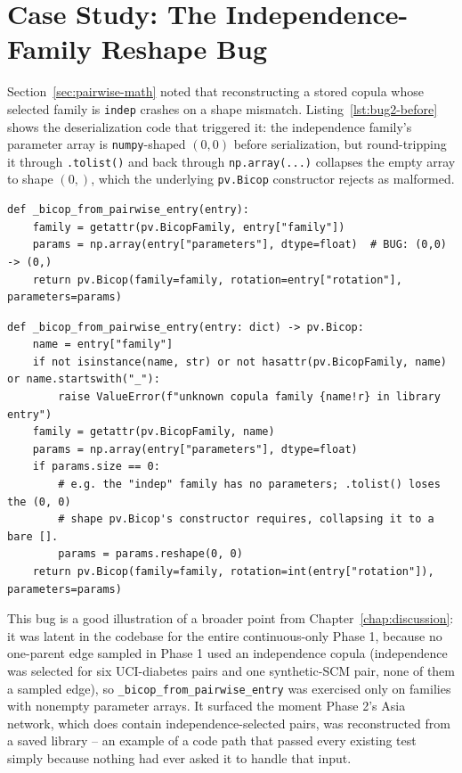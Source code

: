 \documentclass[
  english,
  class=report,
  accentcolor=2c,
  marginpar=false,
  parskip=half-,
  fontsize=11pt,
  ruledheaders=false,
  pdfa=false,
  IMRAD=false,
  thesis={type=master}
]{tudapub}
\begin{document}
\section{Case Study: The Independence-Family Reshape Bug}
Section~\ref{sec:pairwise-math} noted that reconstructing a stored copula
whose selected family is \texttt{indep} crashes on a shape mismatch.
Listing~\ref{lst:bug2-before} shows the deserialization code that
triggered it: the independence family's parameter array is
\texttt{numpy}-shaped $(0,0)$ before serialization, but round-tripping it
through \texttt{.tolist()} and back through \texttt{np.array(...)}
collapses the empty array to shape $(0,)$, which the underlying
\texttt{pv.Bicop} constructor rejects as malformed.

\begin{lstlisting}[caption={Before (simplified from \texttt{\_bicop\_from\_pairwise\_entry}): round-tripping an empty (0,0)-shaped parameter array through JSON collapses it to shape (0,), which the copula constructor rejects.}, label={lst:bug2-before}]
def _bicop_from_pairwise_entry(entry):
    family = getattr(pv.BicopFamily, entry["family"])
    params = np.array(entry["parameters"], dtype=float)  # BUG: (0,0) -> (0,)
    return pv.Bicop(family=family, rotation=entry["rotation"], parameters=params)
\end{lstlisting}

\begin{lstlisting}[caption={After (verbatim from \texttt{gcda/generation/graph\_sampler.py}): an explicit reshape guard restores the (0,0) shape the constructor expects whenever the family carries no parameters; the family name is also validated against pyvinecopulib's families before use.}, label={lst:bug2-after}]
def _bicop_from_pairwise_entry(entry: dict) -> pv.Bicop:
    name = entry["family"]
    if not isinstance(name, str) or not hasattr(pv.BicopFamily, name) or name.startswith("_"):
        raise ValueError(f"unknown copula family {name!r} in library entry")
    family = getattr(pv.BicopFamily, name)
    params = np.array(entry["parameters"], dtype=float)
    if params.size == 0:
        # e.g. the "indep" family has no parameters; .tolist() loses the (0, 0)
        # shape pv.Bicop's constructor requires, collapsing it to a bare [].
        params = params.reshape(0, 0)
    return pv.Bicop(family=family, rotation=int(entry["rotation"]), parameters=params)
\end{lstlisting}

This bug is a good illustration of a broader point from
Chapter~\ref{chap:discussion}: it was latent in the codebase for the
entire continuous-only Phase 1, because no one-parent edge sampled in
Phase 1 used an independence copula (independence was selected for six
UCI-diabetes pairs and one synthetic-SCM pair, none of them a sampled
edge), so \texttt{\_bicop\_from\_pairwise\_entry} was exercised only on
families with nonempty parameter arrays. It surfaced the moment Phase 2's Asia network,
which does contain independence-selected pairs, was reconstructed from a
saved library -- an example of a code path that passed every existing test
simply because nothing had ever asked it to handle that input.
\end{document}
